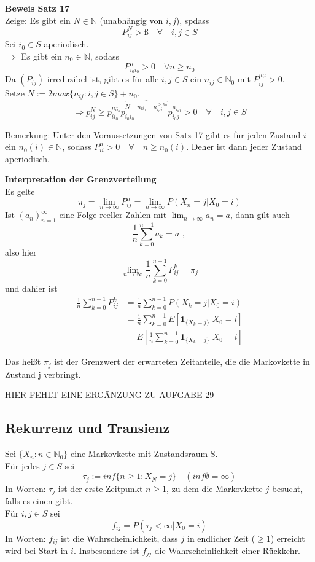 \documentclass[a4paper,12pt]{article}
\begin{document}
\textbf{Beweis Satz 17}\\
Zeige: Es gibt ein $N \in \mathbb{N}$ (unabhängig von $i,j$), spdass
$$
P_{ij}^N > ß \quad \forall \quad i,j \in S
$$
Sei $i_0 \in S$ aperiodisch.\\
$\Rightarrow$ Es gibt ein $n_0 \in \mathbb{N}$, sodass 
$$
P_{i_0i_0}^n > 0 \quad \forall n \geq n_0
$$
Da $(P_{ij})$ irreduzibel ist, gibt es für alle $i,j \in S$ ein 
$n_{ij}\in \mathbb{N}_0$ mit $P_{ij}^{n_{ij}}> 0$.\\
Setze $N:= 2max \{n_{ij}: i,j \in S\} + n_0$.
$$
\Rightarrow p_{ij}^N \geq
p_{ii_0}^{n_{ii_0}} p_{i_0i_0}^{    \overbrace{N - n_{ii_0} - n_{i_0j}^{\geq n_0}}}p_{i_0j}^{n_{i_0j}} > 0 \quad \forall \quad i,j \in S
$$

Bemerkung: Unter den Voraussetzungen von Satz 17 gibt es für jeden Zustand $i$ ein $n_0(i) \in \mathbb{N}$,
sodass $P_{ii}^n > 0 \quad \forall \quad n \geq n_0(i)$. Deher ist dann jeder Zustand aperiodisch.


\textbf{Interpretation der Grenzverteilung}\\
Es gelte 
$$
\pi_j = \lim_{n \to \infty}P_{ij}^n = \lim_{n \to \infty}P(X_n = j | X_0 =i)
$$
Ist $(a_n)_{n=1}^\infty$ eine Folge reeller Zahlen mit $\lim_{n \to \infty}a_n = a$, dann gilt auch
$$
\frac{1}{n}\sum_{k=0}^{n-1}a_k = a \text{ , }
$$
also hier
$$
\lim_{n \to \infty} \frac{1}{n} \sum_{k=0}^{n-1}P_{ij}^k = \pi_j
$$
und dahier ist
\begin{align*}
\frac{1}{n}\sum_{k=0}^{n-1}P_{ij}^k & = \frac{1}{n}\sum_{k=0}^{n-1}P(X_k = j | X_0 =i)\\
& = \frac{1}{n}\sum_{k=0}^{n-1} E \left[\textbf{1}_{\{X_k = j\}}|X_0 = i\right] \\
& = E \left[\frac{1}{n}\sum_{k=0}^{n-1}  \textbf{1}_{\{X_k = j\}} | X_0 =i             \right]
\end{align*}

Das heißt $\pi_j$ ist der Grenzwert der erwarteten Zeitanteile, die die Markovkette in Zustand j verbringt. 



\begin{tcolorbox}[breakable, colframe=blue, colback=white, title=Beispiel 14]
HIER FEHLT EINE ERGÄNZUNG ZU AUFGABE 29
\end{tcolorbox}


\subsection{Rekurrenz und Transienz}
Sei $\{X_n: n \in \mathbb{N}_0\}$ eine Markovkette mit Zustandsraum S.\\
Für jedes $j \in S$ sei
$$
\tau_j := inf\{n  \geq 1: X_N = j\} \quad (inf \emptyset = \infty)
$$
In Worten: $\tau_j$ ist der erste Zeitpunkt $n \geq 1$, zu dem die Markovkette $j$ besucht, falls es einen gibt.\\
Für $i,j \in S$ sei 
$$
f_{ij} = P(\tau_j < \infty | X_0 = i)
$$
In Worten: $f_{ij}$ ist die Wahrscheinlichkeit, dass $j$ in endlicher Zeit ($\geq 1$) erreicht wird bei Start in $i$.
Insbesondere ist $f_{jj}$ die Wahrscheinlichkeit einer Rückkehr.\\
\end{document}
